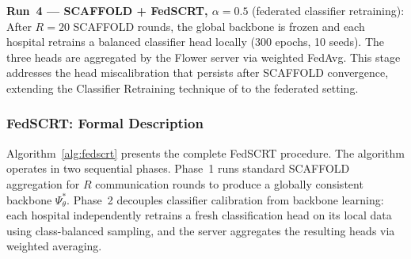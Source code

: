 \textbf{Run~4 --- SCAFFOLD + FedSCRT, $\alpha=0.5$}
(federated classifier retraining):
After $R=20$ SCAFFOLD rounds, the global backbone
is frozen and each hospital retrains a balanced
classifier head locally (300 epochs, 10 seeds).
The three heads are aggregated by the Flower server
via weighted FedAvg.
This stage addresses the head miscalibration that
persists after SCAFFOLD convergence, extending the
Classifier Retraining technique of
\cite{cao2019ldam} to the federated setting.


\subsubsection*{FedSCRT: Formal Description}

Algorithm~\ref{alg:fedscrt} presents the complete
FedSCRT procedure.
The algorithm operates in two sequential phases.
Phase~1 runs standard SCAFFOLD aggregation for $R$
communication rounds to produce a globally consistent
backbone $\Psi^*_\theta$.
Phase~2 decouples classifier calibration from backbone
learning: each hospital independently retrains a fresh
classification head on its local data using class-balanced
sampling, and the server aggregates the resulting heads
via weighted averaging.

